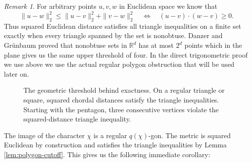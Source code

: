 \documentclass[11pt]{article}
\theoremstyle{definition}
\theoremstyle{remark}
\newtheorem{remark}[theorem]{Remark}
\newcommand{\R}{\mathbb{R}}
\begin{document}
\begin{remark}
\label{rem:nonobtuse}
For arbitrary points $u,v,w$ in Euclidean space we know that
\[
  \|u-w\|_2^2\le\|u-v\|_2^2+\|v-w\|_2^2
  \quad\Longleftrightarrow\quad
  (u-v)\cdot(w-v)\ge0.
\]
Thus squared Euclidean distance satisfies all triangle inequalities on a finite set exactly when every triangle spanned by the set is nonobtuse. Danzer and Gr\"unbaum proved that  nonobtuse sets in $\R^d$ has at most $2^d$ points \cite{DG62} which in the plane gives us the same upper threshold of four. In the direct trigonometric proof we use above we use the actual regular polygon obstruction that will be used later on.
\end{remark}


\begin{figure}[H]
\centering
{}
\caption{The geometric threshold behind exactness. On a regular triangle or square, squared chordal distances satisfy the triangle inequalities. Starting with the pentagon, three consecutive vertices violate the squared-distance triangle inequality.}
\label{fig:polygon-cutoff}
\end{figure}


The image of the character $\chi$ is a regular $q(\chi)$-gon. The metric is squared Euclidean by construction and satisfies the triangle inequalities by Lemma \ref{lem:polygon-cutoff}. This gives us the following immediate corollary: 
\end{document}
